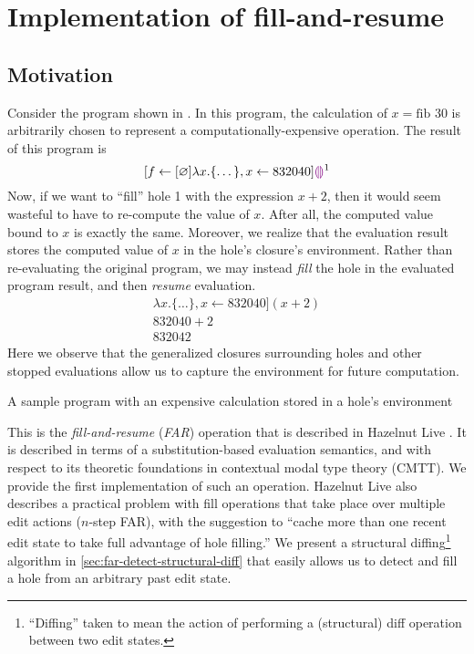 \chapter{Implementation of fill-and-resume}
\label{sec:far_impl}

\section{Motivation}
\label{sec:far-motivation}

Consider the program shown in . In this program, the calculation of $x=\text{fib }30$ is arbitrarily chosen to represent a computationally-expensive operation. The result of this program is \[
  [f\leftarrow [\varnothing]\lambda x.\{\dots\},x\leftarrow 832040]\textcolor{violet}{\llparenthesis}\textcolor{violet}{\rrparenthesis}^1
\]
Now, if we want to ``fill'' hole 1 with the expression $x+2$, then it would seem wasteful to have to re-compute the value of $x$. After all, the computed value bound to $x$ is exactly the same. Moreover, we realize that the evaluation result stores the computed value of $x$ in the hole's closure's environment. Rather than re-evaluating the original program, we may instead \textit{fill} the hole in the evaluated program result, and then \textit{resume} evaluation.
\begin{gather*}
  [f\leftarrow [\varnothing]\lambda x.\{\dots\},x\leftarrow 832040](x+2) \\
  832040+2 \\
  832042
\end{gather*}
Here we observe that the generalized closures surrounding holes and other stopped evaluations allow us to capture the environment for future computation.

\begin{listing}
  \centering
  \caption{A sample program with an expensive calculation stored in a hole's environment}
  \label{fig:far-motivation}
\end{listing}

This is the \textit{fill-and-resume} (\textit{FAR}) operation that is described in Hazelnut Live \cite{conf/popl/HazelnutLive19}. It is described in terms of a substitution-based evaluation semantics, and with respect to its theoretic foundations in contextual modal type theory (CMTT). We provide the first implementation of such an operation. Hazelnut Live also describes a practical problem with fill operations that take place over multiple edit actions ($n$-step FAR), with the suggestion to ``cache more than one recent edit state to take full advantage of hole filling.'' We present a structural diffing\footnote{``Diffing'' taken to mean the action of performing a (structural) diff operation between two edit states.} algorithm in \cref{sec:far-detect-structural-diff} that easily allows us to detect and fill a hole from an arbitrary past edit state.

